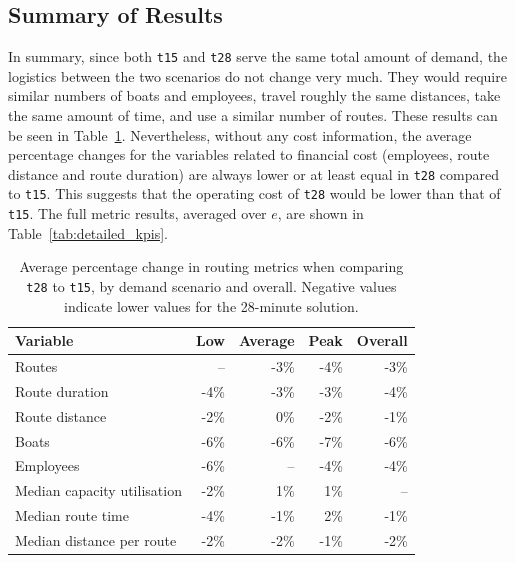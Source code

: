 \documentclass[12pt]{article}
\begin{document}
\subsection{Summary of Results}
\label{subsec:results-summary}

In summary, since both \texttt{t15} and \texttt{t28} serve the same total amount of demand, the logistics between the two scenarios do not change very much. They would require similar numbers of boats and employees, travel roughly the same distances, take the same amount of time, and use a similar number of routes. These results can be seen in Table~\ref{tab:results-sum}. Nevertheless, without any cost information, the average percentage changes for the variables related to financial cost (employees, route distance and route duration) are always lower or at least equal in \texttt{t28} compared to \texttt{t15}. This suggests that the operating cost of \texttt{t28} would be lower than that of \texttt{t15}. The full metric results, averaged over \(e\), are shown in Table~\ref{tab:detailed_kpis}.

\begin{table}[htbp]
  \centering
  \caption{Average percentage change in routing metrics when comparing \texttt{t28} to \texttt{t15}, by demand scenario and overall. Negative values indicate lower values for the 28-minute solution.}
  \label{tab:results-sum}

  \begin{tabular}{l|rrrr}
    \toprule
    \textbf{Variable}           & \textbf{Low} & \textbf{Average} & \textbf{Peak} & \textbf{Overall} \\
    \midrule
    Routes                      & --           & -3\%             & -4\%          & -3\%             \\
    Route duration              & -4\%         & -3\%             & -3\%          & -4\%             \\
    Route distance              & -2\%         & 0\%              & -2\%          & -1\%             \\
    Boats                       & -6\%         & -6\%             & -7\%          & -6\%             \\
    Employees                   & -6\%         & --               & -4\%          & -4\%             \\
    Median capacity utilisation & -2\%         & 1\%              & 1\%           & --               \\
    Median route time           & -4\%         & -1\%             & 2\%           & -1\%             \\
    Median distance per route   & -2\%         & -2\%             & -1\%          & -2\%             \\
    \bottomrule
  \end{tabular}
\end{table}
\end{document}
